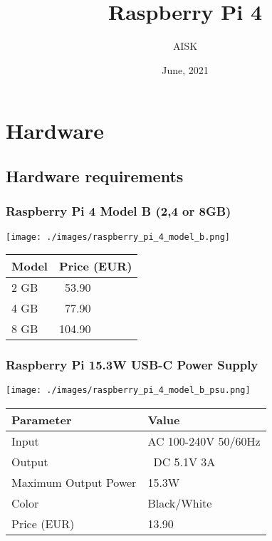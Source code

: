 \documentclass[10pt, a4paper, onecolumn, openany]{book} %
\title{\textbf{Raspberry Pi 4}}
\author{AISK}
\date{June, 2021}
\begin{document}
\maketitle
\tableofcontents

\chapter{Hardware}
\section{Hardware requirements}
\subsection{Raspberry Pi 4 Model B (2,4 or 8GB)}
\begin{center}
    \texttt{[image: ./images/raspberry\_pi\_4\_model\_b.png]}
\end{center}
\begin{center}
    \begin{small}
    \begin{tabular}{|p{4cm}|p{4cm}|}
    \hline
    \textbf{Model} & \textbf{Price (EUR)} \\
    \hline
    2 GB & \ 53.90 \\
    \hline
    4 GB & \ 77.90 \\
    \hline
    8 GB & 104.90 \\
    \hline
    \end{tabular}
    \end{small}
\end{center}

\subsection{Raspberry Pi 15.3W USB-C Power Supply}
\begin{center}
    \texttt{[image: ./images/raspberry\_pi\_4\_model\_b\_psu.png]}
\end{center}    
\begin{center}
    \begin{small}
    \begin{tabular}{|p{4cm}|p{4cm}|}
    \hline
    \textbf{Parameter} & \textbf{Value} \\
    \hline
    Input & AC 100-240V 50/60Hz  \\
    \hline
    Output & \ DC 5.1V 3A \\
    \hline
    Maximum Output Power & 15.3W \\
    \hline
    Color & Black/White \\
    \hline
    Price (EUR) & 13.90 \\
    \hline
    \end{tabular}
    \end{small}
\end{center}
\end{document}

